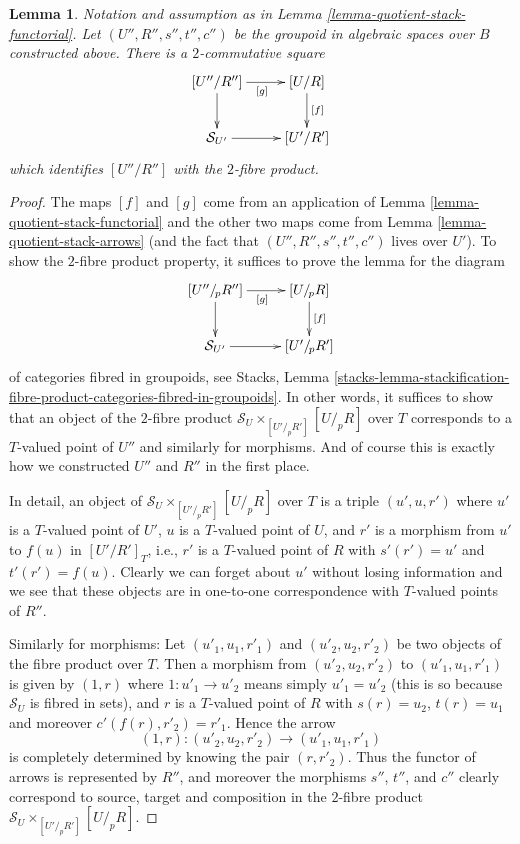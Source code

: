\documentclass{stacks-project}
\theoremstyle{plain}
\newtheorem{lemma}[subsection]{Lemma}
\theoremstyle{definition}
\theoremstyle{remark}
\numberwithin{equation}{subsection}
\begin{document}
\begin{lemma}
\label{lemma-cartesian-square-of-morphism}
Notation and assumption as in
Lemma \ref{lemma-quotient-stack-functorial}.
Let $(U'', R'', s'', t'', c'')$ be the groupoid in algebraic spaces over $B$
constructed above.
There is a $2$-commutative square
$$
\xymatrix{
[U''/R''] \ar[d] \ar[r]_{[g]} & [U/R] \ar[d]^{[f]} \\
\mathcal{S}_{U'} \ar[r] & [U'/R']
}
$$
which identifies $[U''/R'']$ with the $2$-fibre product.
\end{lemma}

\begin{proof}
The maps $[f]$ and $[g]$ come from an application of
Lemma \ref{lemma-quotient-stack-functorial}
and the other two maps come from
Lemma \ref{lemma-quotient-stack-arrows}
(and the fact that $(U'', R'', s'', t'', c'')$ lives over $U'$).
To show the $2$-fibre product property, it suffices to prove the lemma
for the diagram
$$
\xymatrix{
[U''/_{\!p}R''] \ar[d] \ar[r]_{[g]} & [U/_{\!p}R] \ar[d]^{[f]} \\
\mathcal{S}_{U'} \ar[r] & [U'/_{\!p}R']
}
$$
of categories fibred in groupoids, see
Stacks, Lemma
\ref{stacks-lemma-stackification-fibre-product-categories-fibred-in-groupoids}.
In other words, it suffices to show that an object of the $2$-fibre product
$\mathcal{S}_U \times_{[U'/_{\!p}R']} [U/_{\!p}R]$ over $T$ corresponds
to a $T$-valued point of $U''$ and similarly for morphisms. And of course
this is exactly how we constructed $U''$ and $R''$ in the first place.

\medskip\noindent
In detail, an object of $\mathcal{S}_U \times_{[U'/_{\!p}R']} [U/_{\!p}R]$
over $T$ is a triple $(u', u, r')$ where $u'$ is a $T$-valued point of $U'$,
$u$ is a $T$-valued point of $U$, and $r'$ is a morphism from $u'$ to
$f(u)$ in $[U'/R']_T$, i.e., $r'$ is a $T$-valued point of $R$ with
$s'(r') = u'$ and $t'(r') = f(u)$. Clearly we can forget about $u'$
without losing information and we see that these objects are in one-to-one
correspondence with $T$-valued points of $R''$.

\medskip\noindent
Similarly for morphisms: Let $(u'_1, u_1, r'_1)$ and $(u'_2, u_2, r'_2)$ be
two objects of the fibre product over $T$. Then a morphism from
$(u'_2, u_2, r'_2)$ to $(u'_1, u_1, r'_1)$
is given by $(1, r)$ where $1 : u'_1 \to u'_2$ means simply $u'_1 = u'_2$
(this is so because $\mathcal{S}_U$ is fibred in sets), and $r$ is a
$T$-valued point of $R$ with $s(r) = u_2$, $t(r) = u_1$ and moreover
$c'(f(r), r'_2) = r'_1$. Hence the arrow
$$
(1, r) : (u'_2, u_2, r'_2) \to (u'_1, u_1, r'_1)
$$
is completely determined by knowing the pair $(r, r'_2)$. Thus the functor
of arrows is represented by $R''$, and moreover the morphisms $s''$, $t''$,
and $c''$ clearly correspond to source, target and composition in
the $2$-fibre product $\mathcal{S}_U \times_{[U'/_{\!p}R']} [U/_{\!p}R]$.
\end{proof}
\end{document}
